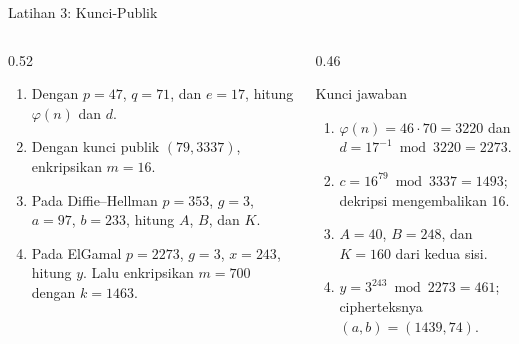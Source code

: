 \documentclass[aspectratio=169,11pt]{beamer}
\begin{document}
\begin{frame}{Latihan 3: Kunci-Publik}
    \scriptsize
    \begin{columns}[T,onlytextwidth]
        \begin{column}{0.52\textwidth}
            \begin{enumerate}
                \setlength{\itemsep}{4pt}
                \item Dengan $p=47$, $q=71$, dan $e=17$, hitung
                      $\varphi(n)$ dan $d$.
                \item Dengan kunci publik $(79,3337)$, enkripsikan $m=16$.
                \item Pada Diffie--Hellman $p=353$, $g=3$, $a=97$, $b=233$,
                      hitung $A$, $B$, dan $K$.
                \item Pada ElGamal $p=2273$, $g=3$, $x=243$, hitung $y$.
                      Lalu enkripsikan $m=700$ dengan $k=1463$.
            \end{enumerate}
        \end{column}
        \begin{column}{0.46\textwidth}
            \begin{block}{Kunci jawaban}
                \begin{enumerate}
                    \setlength{\itemsep}{3pt}
                    \item $\varphi(n)=46\cdot70=3220$ dan
                          $d=17^{-1}\bmod3220=2273$.
                    \item $c=16^{79}\bmod3337=1493$; dekripsi mengembalikan 16.
                    \item $A=40$, $B=248$, dan $K=160$ dari kedua sisi.
                    \item $y=3^{243}\bmod2273=461$; cipherteksnya
                          $(a,b)=(1439,74)$.
                \end{enumerate}
            \end{block}
        \end{column}
    \end{columns}
\end{frame}
\end{document}
